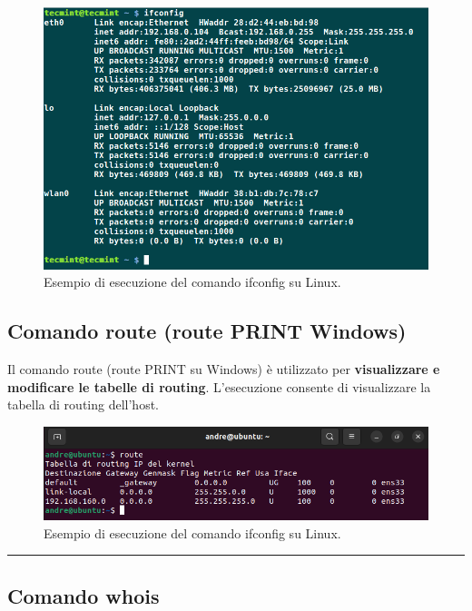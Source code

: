 \documentclass[a4paper]{article}
\newcommand{\longline}{\noindent\rule{\textwidth}{0.4pt}}
\begin{document}
	\begin{figure}[!htp]
		\centering
		\includegraphics[width=\textwidth]{img/altri-strumenti/ifconfig.png}
		\caption{Esempio di esecuzione del comando \textsf{ifconfig} su Linux.}
	\end{figure}\newpage

	\subsection{Comando \textsf{route} (\textsf{route PRINT} Windows)}
	
	Il comando \textcolor{Red3}{\textsf{route}} (\textsf{route PRINT} su Windows) è utilizzato per \textbf{visualizzare e modificare le tabelle di routing}. L'esecuzione consente di visualizzare la tabella di routing dell'host.

	\begin{figure}[!htp]
		\centering
		\includegraphics[width=\textwidth]{img/altri-strumenti/route.png}
		\caption{Esempio di esecuzione del comando \textsf{ifconfig} su Linux.}
	\end{figure}

	\longline	

	\subsection{Comando \textsf{whois}}
	
\end{document}
